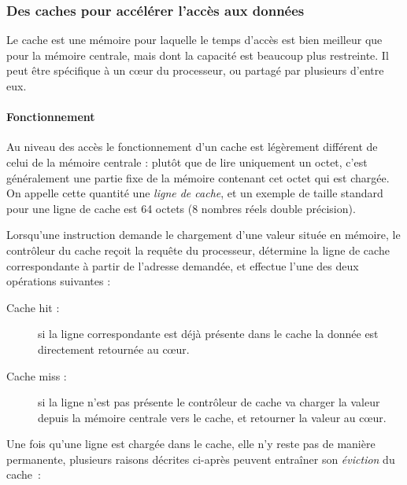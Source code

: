 \subsubsection{Des caches pour accélérer l'accès aux données}\label{sec:context:numa:cache}

Le cache est une mémoire pour laquelle le temps d'accès est bien meilleur que pour la mémoire centrale, mais dont la capacité est beaucoup plus restreinte. Il peut être spécifique à un cœur du processeur, ou partagé par plusieurs d'entre eux.

\paragraph{Fonctionnement}

Au niveau des accès le fonctionnement d'un cache est légèrement différent de celui de la mémoire centrale : plutôt que de lire uniquement un octet, c'est généralement une partie fixe de la mémoire contenant cet octet qui est chargée.
On appelle cette quantité une \emph{ligne de cache}, et un exemple de taille standard pour une ligne de cache est 64 octets (8 nombres réels double précision).

Lorsqu'une instruction demande le chargement d'une valeur située en mémoire, le contrôleur du cache reçoit la requête du processeur, détermine la ligne de cache correspondante à partir de l'adresse demandée, et effectue l'une des deux opérations suivantes :
\begin{description}
  \item [Cache hit :] si la ligne correspondante est déjà présente dans le cache la donnée est directement retournée au cœur.
  \item [Cache miss :] si la ligne n'est pas présente le contrôleur de cache va charger la valeur depuis la mémoire centrale vers le cache, et retourner la valeur au cœur.
\end{description}

Une fois qu'une ligne est chargée dans le cache, elle n'y reste pas de manière permanente, plusieurs raisons décrites ci-après peuvent entraîner son \emph{éviction} du cache~:

